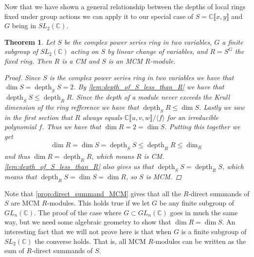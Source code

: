 \documentclass[11pt, a4paper, english]{article}
\newtheorem{theorem}{Theorem}[section]
\theoremstyle{definition}
\newcommand{\C}{\mathbb{C}}
\DeclareMathOperator{\depth}{depth}
\begin{document}
Now that we have shown a general relationship between the depths of local rings fixed under group actions we can apply it to our special case of $S = \C\llbracket x, y \rrbracket$ and $G$ being in $SL_2(\C)$.

\begin{theorem}
\label{thm:S_MCM}
Let $S$ be the complex power series ring in two variables, $G$ a finite subgroup of $SL_2(\C)$ acting on $S$ by linear change of variables, and $R=S^G$ the fixed ring. Then $R$ is a CM and $S$ is an MCM $R$-module.
\begin{proof}
Since $S$ is the complex power series ring in two variables we have that $\dim S = \depth_SS=2$. By \cref{lem:depth_of_S_less_than_R} we have that $\depth_SS \leq \depth_RR$. Since the depth of a module never exceeds the Krull dimension of the ring {\color{red}refference} we have that $\depth_SR \leq \dim S$. Lastly we saw in the first section that $R$ always equals $\C\llbracket u, v, w \rrbracket/\langle f \rangle$ for an irreducible polynomial $f$. Thus we have that $\dim R = 2 = \dim S$. Putting this together we get
\begin{align*}
\dim R = \dim S = \depth_SS \leq \depth_RR \leq \dim_R
\end{align*}
and thus $\dim R = \depth_RR$, which means $R$ is CM. \cref{lem:depth_of_S_less_than_R} also gives us that $\depth_SS = \depth_RS$, which means that $\depth_RS = \dim S = \dim R$, so $S$ is MCM.
\end{proof}
\end{theorem}

Note that \cref{prop:direct_summand_MCM} gives that all the $R$-direct summands of $S$ are MCM $R$-modules. This holds true if we let $G$ be any finite subgroup of $GL_n(\C)$. The proof of the case where $G \subset GL_n(\C)$ goes in much the same way, but we need some algebraic geometry to show that $\dim R = \dim S$. An interesting fact that we will not prove here is that when $G$ is a finite subgroup of $SL_2(\C)$ the converse holds. That is, all MCM $R$-modules can be written as the sum of $R$-direct summands of $S$.
\end{document}

